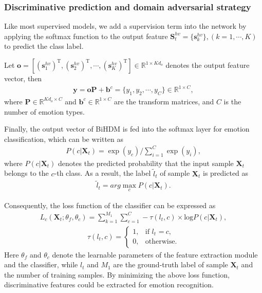 \documentclass[journal]{IEEEtran}
\begin{document}
\subsubsection{Discriminative prediction and domain adversarial strategy}

Like most supervised models, we add a supervision term into the network by applying the softmax function to the output feature $\mathbf{S}_t^{hv} \!\!=\! \{\mathbf{s}^{hv}_k\},(k\!=\!1,\cdots,K)$ to predict the class label.

Let $\mathbf{o} = [(\mathbf{s}^{hv}_1)^\mathrm{T}, (\mathbf{s}^{hv}_2)^\mathrm{T}, \cdots, (\mathbf{s}^{hv}_K)^\mathrm{T} ] \in \mathbb{R}^{1 \times Kd_o}$ denotes the output feature vector, then 
\begin{eqnarray}
\mathbf{y} = \mathbf{o}\mathbf{P} + \mathbf{b}^c = \{y_1,y_2,\cdots,y_C\} \in \mathbb{R}^{1 \times C},
\end{eqnarray}  
where $\mathbf{P} \!\in\! \mathbb{R}^{Kd_o \times C}$ and $\mathbf{b}^c \!\in\! \mathbb{R}^{1 \times C}$ are the transform matrices, and $C$ is the number of emotion types.

Finally, the output vector of BiHDM is fed into the softmax layer for emotion classification, which can be written as
\begin{eqnarray}
\label{Eq: classifier}
P(c|\mathbf{X}_t)= \exp(y_c)/\sum\nolimits^{C}_{i=1} \exp(y_i),
\end{eqnarray}  
where $P(c|\mathbf{X}_t)$ denotes the predicted probability that the input sample $\mathbf{X}_t$ belongs to the $c$-th class. As a result, the label $\tilde{l}_t$ of sample $\mathbf{X}_t$ is predicted as 
\begin{eqnarray}
\tilde{l}_t = arg \max_c  P(c|\mathbf{X}_t).
\end{eqnarray}  

Consequently, the loss function of the classifier can be expressed as
\begin{eqnarray}
\label{Eq: loss function classifier}
L_c(\mathbf{X}_t;\theta_f,\theta_c)= \sum_{k=1}^{M_1} \sum_{c=1}^C-\tau (l_t, c)\times \textrm{log} P(c|\mathbf{X}_t),
\end{eqnarray}
\vspace{-0.25cm}
\begin{align}
\tau(l_t, c)=\left\{
\begin{array}{lr}
1, & \textrm{if $l_t$ =}~c,~\\
0, & \textrm{otherwise}.
\end{array}
\right.
\end{align}
Here $\theta_f$ and $\theta_c$ denote the learnable parameters of the feature extraction module and the classifier, while $l_t$ and $M_1$ are the ground-truth label of sample $\mathbf{X}_t$ and the number of training samples. By minimizing the above loss function, discriminative features could be extracted for emotion recognition.
\end{document}
